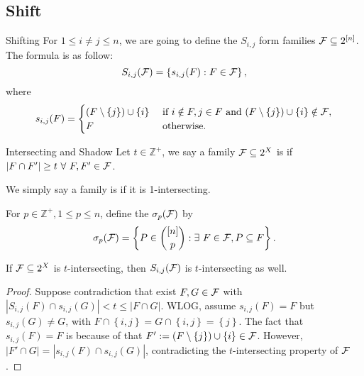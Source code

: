 \subsection{Shift}

\begin{definition}[def:]{Shifting}
    For $1\leq i\neq j\leq n$, we are going to define the  $S_{i,j}$ form families $\mathcal{F}\subseteq 2^{[n]}$. The formula is as follow:
    \[S_{i,j}(\mathcal{F})=\left\{s_{i,j}(F):F\in \mathcal{F}\right\},\]
    where
    \[s_{i,j}(F)=
        \begin{cases}
            (F\setminus \left\{j\right\})\cup \left\{i\right\}&\textnormal{ if }i\notin F,j\in F\textnormal{ and }(F\setminus \left\{j\right\})\cup \left\{i\right\}\notin \mathcal{F},\\
            F&\textnormal{ otherwise.}
        \end{cases}
    \]
\end{definition}

\begin{definition}[def:]{Intersecting and Shadow}
    Let $t\in \mathbb{Z}^+$, we say a family $\mathcal{F}\subseteq 2^X$ is  if $\left|F\cap F'\right|\geq t\ \forall\ F,F'\in \FF$.

    We simply say a family is  if it is 1-intersecting. 

    For $p\in \mathbb{Z}^+, 1\leq p\leq n$, define the  $\sigma _p(\mathcal{F})$ by
    \[\sigma _p(\mathcal{F})=\left\{P\in {[n]\choose p}:\exists\ F\in \mathcal{F}, P\subseteq F\right\}.\]
\end{definition}

\begin{proposition}{}
    If $\mathcal{F}\subseteq 2^X$ is $t$-intersecting, then $S_{i,j}(\mathcal{F})$ is $t$-intersecting as well.
\end{proposition}

\begin{proof}
    Suppose contradiction that exist $F,G\in \mathcal{F}$ with $\left|S_{i,j}(F)\cap s_{i,j}(G)\right|<t\leq \left|F\cap G\right|$. WLOG, assume $s_{i,j}(F)=F$ but $s_{i,j}(G)\neq G$, with $F\cap \left\{i,j\right\}=G\cap \left\{i,j\right\}=\left\{j\right\}$. The fact that $s_{i,j}(F)=F$ is because of that $F':=(F\setminus \left\{j\right\})\cup \left\{i\right\}\in \mathcal{F}$. However, $\left|F'\cap G\right|=\left|s_{i,j}(F)\cap s_{i,j}(G)\right|$, contradicting the $t$-intersecting property of $\mathcal{F}$.
\end{proof}

